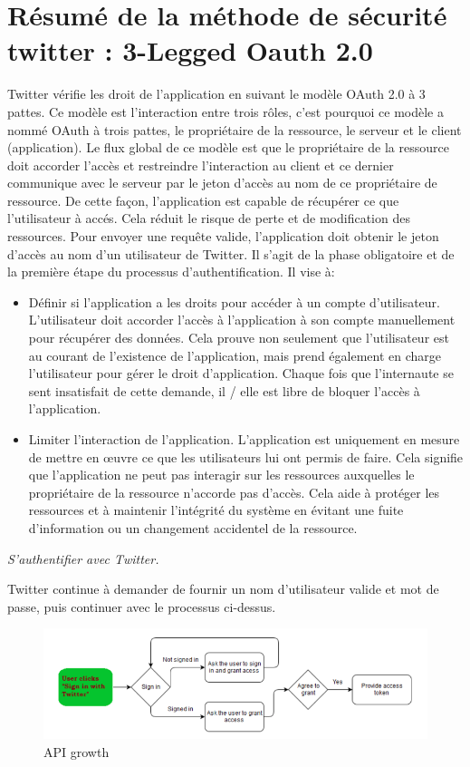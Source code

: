 \section{Résumé de la méthode de sécurité twitter : 3-Legged Oauth 2.0}
Twitter vérifie les droit de l'application en suivant le modèle OAuth 2.0 à 3 pattes. Ce modèle est l'interaction entre trois rôles, c'est pourquoi ce modèle a nommé OAuth à trois pattes, le propriétaire de la ressource, le serveur et le client (application). Le flux global de ce modèle est que le propriétaire de la ressource doit accorder l'accès et restreindre l'interaction au client et ce dernier communique avec le serveur par le jeton d'accès au nom de ce propriétaire de ressource. De cette façon, l'application est capable de récupérer ce que l'utilisateur à accés. Cela réduit le risque de perte et de modification des ressources. Pour envoyer une requête valide, l'application doit obtenir le jeton d'accès au nom d'un utilisateur de Twitter. Il s'agit de la phase obligatoire et de la première étape du processus d'authentification. Il vise à:
\begin{itemize}
\item Définir si l'application a les droits pour accéder à un compte d'utilisateur. L'utilisateur doit accorder l'accès à l'application à son compte manuellement pour récupérer des données. Cela prouve non seulement que l'utilisateur est au courant de l'existence de l'application, mais prend également en charge l'utilisateur pour gérer le droit d'application. Chaque fois que l'internaute se sent insatisfait de cette demande, il / elle est libre de bloquer l'accès à l'application.
\item Limiter l'interaction de l'application. L'application est uniquement en mesure de mettre en œuvre ce que les utilisateurs lui ont permis de faire. Cela signifie que l'application ne peut pas interagir sur les ressources auxquelles le propriétaire de la ressource n'accorde pas d'accès. Cela aide à protéger les ressources et à maintenir l'intégrité du système en évitant une fuite d'information ou un changement accidentel de la ressource.

\end{itemize}

\textit{S'authentifier avec Twitter.}


Twitter continue à demander de fournir un nom d'utilisateur valide et mot de passe, puis continuer avec le processus ci-dessus.
\begin{figure}[! ht ]
			\centering
			\includegraphics[scale=.4]{./images/twitter_signin.png}
			\caption {API growth}
		\end{figure}
		
